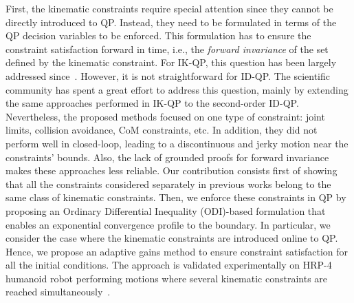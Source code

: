 First, the kinematic constraints require special attention since they cannot be directly introduced to QP. Instead, they need to be formulated in terms of the QP decision variables to be enforced. This formulation has to ensure the constraint satisfaction forward in time, i.e., the \emph{forward invariance} of the set defined by the kinematic constraint. For IK-QP, this question has been largely addressed since~\cite{faverjon1987icra}. However, it is not straightforward for ID-QP. 
The scientific community has spent a great effort to address this question, mainly by extending the same approaches performed in IK-QP to the second-order ID-QP. Nevertheless, the proposed methods focused on one type of constraint: joint limits, collision avoidance, CoM constraints, etc. In addition, they did not perform well in closed-loop, leading to a discontinuous and jerky motion near the constraints' bounds. Also, the lack of grounded proofs for forward invariance makes these approaches less reliable. Our contribution consists first of showing that all the constraints considered separately in previous works belong to the same class of kinematic constraints. Then, we enforce these constraints in QP by proposing an Ordinary Differential Inequality (ODI)-based formulation that enables an exponential convergence profile to the boundary. In particular, we consider the case where the kinematic constraints are introduced online to QP. Hence, we propose an adaptive gains method to ensure constraint satisfaction for all the initial conditions. The approach is validated experimentally on HRP-4 humanoid robot performing motions where several kinematic constraints are reached simultaneously~\cite{djeha2020ral}. 
    
